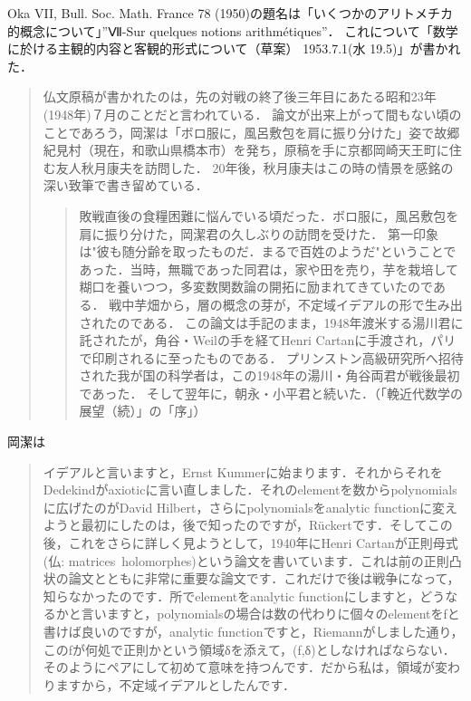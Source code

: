 \documentclass[uplatex, dvipdfmx]{jsreport}
\begin{document}
\begin{tcolorbox}[colframe=ForestGreen, colback=ForestGreen!10!white, breakable ,colbacktitle=ForestGreen!40!white, coltitle=black,fonttitle=\bfseries\sffamily,
    title=岡の第七論文]
    Oka VII, Bull. Soc. Math. France 78 (1950)の題名は「いくつかのアリトメチカ的概念について」”Ⅶ-Sur quelques notions arithmétiques”．
    これについて「数学に於ける主観的内容と客観的形式について（草案） 1953.7.1(水 19.5)」が書かれた．
    \begin{quote}
        仏文原稿が書かれたのは，先の対戦の終了後三年目にあたる昭和23年(1948年)７月のことだと言われている．
        論文が出来上がって間もない頃のことであろう，岡潔は「ボロ服に，風呂敷包を肩に振り分けた」姿で故郷紀見村（現在，和歌山県橋本市）を発ち，原稿を手に京都岡崎天王町に住む友人秋月康夫を訪問した．
        20年後，秋月康夫はこの時の情景を感銘の深い致筆で書き留めている．
        \begin{quote}
            敗戦直後の食糧困難に悩んでいる頃だった．ボロ服に，風呂敷包を肩に振り分けた，岡潔君の久しぶりの訪問を受けた．
            第一印象は"彼も随分齢を取ったものだ．まるで百姓のようだ"ということであった．当時，無職であった同君は，家や田を売り，芋を栽培して
            糊口を養いつつ，多変数関数論の開拓に励まれてきていたのである．
            戦中芋畑から，層の概念の芽が，不定域イデアルの形で生み出されたのである．
            この論文は手記のまま，1948年渡米する湯川君に託されたが，角谷・Weilの手を経てHenri Cartanに手渡され，パリで印刷されるに至ったものである．
            プリンストン高級研究所へ招待された我が国の科学者は，この1948年の湯川・角谷両君が戦後最初であった．
            そして翌年に，朝永・小平君と続いた．（「輓近代数学の展望（続）」の「序」）
        \end{quote}
    \end{quote}
    岡潔は
    \begin{quote}
        イデアルと言いますと，Ernst Kummerに始まります．それからそれをDedekindがaxioticに言い直しました．それのelementを数からpolynomialsに広げたのがDavid Hilbert，さらにpolynomialsをanalytic functionに変えようと最初にしたのは，後で知ったのですが，Rückertです．そしてこの後，これをさらに詳しく見ようとして，1940年にHenri Cartanが正則母式(仏: matrices holomorphes)という論文を書いています．これは前の正則凸状の論文とともに非常に重要な論文です．これだけで後は戦争になって，知らなかったのです．所でelementをanalytic functionにしますと，どうなるかと言いますと，polynomialsの場合は数の代わりに個々のelementをfと書けば良いのですが，analytic functionですと，Riemannがしました通り，このfが何処で正則かという領域δを添えて，(f,δ)としなければならない．そのようにペアにして初めて意味を持つんです．だから私は，領域が変わりますから，不定域イデアルとしたんです．

\end{quote}
\end{tcolorbox}
\end{document}
